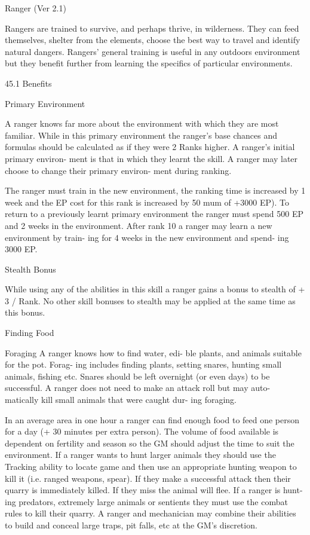 \begin{Chapter}{Ranger (Ver 2.1)}

Rangers are trained to survive, and perhaps thrive, 
in  wilderness.  They  can  feed  themselves,  shelter 
from  the  elements,  choose  the  best  way  to  travel 
and  identify  natural  dangers.  Rangers’  general 
training  is  useful  in any  outdoors  environment but 
they  benefit  further  from  learning  the  specifics  of 
particular environments. 

45.1 Benefits 

Primary Environment 

A  ranger  knows  far  more  about  the  environment 
with  which  they  are  most  familiar.  While  in  this 
primary environment the ranger’s base chances and 
formulas  should  be  calculated  as  if  they  were  2 
Ranks  higher.  A  ranger’s  initial  primary  environ-
ment is that in which they learnt the skill. A ranger 
may  later  choose  to  change  their  primary  environ-
ment during ranking. 

The ranger must train in the new environment, the 
ranking  time  is  increased  by  1  week  and  the  EP 
cost  for  this  rank  is  increased  by  50%
mum  of  +3000  EP).  To  return  to  a  previously 
learnt  primary  environment  the  ranger  must  spend 
500 EP and 2 weeks in the environment. After rank 
10 a ranger may learn a new environment by train-
ing for 4 weeks in the new environment and spend-
ing 3000 EP. 

Stealth Bonus 

While  using  any  of  the  abilities  in  this  skill  a 
ranger  gains  a  bonus  to  stealth  of  +  3  /  Rank.  No 
other skill bonuses to stealth may be applied at the 
same time as this bonus. 

Finding Food 

Foraging  A  ranger  knows  how  to  find  water,  edi-
ble plants, and animals suitable for the pot. Forag-
ing  includes  finding  plants,  setting  snares,  hunting 
small  animals,  fishing  etc.  Snares  should  be  left 
overnight (or even days) to be successful. A ranger 
does not need to make an attack roll but may auto-
matically  kill  small  animals  that  were  caught  dur-
ing foraging. 

In  an  average  area  in  one  hour  a  ranger  can  find 
enough  food  to  feed  one  person  for  a  day  (+  30 
minutes  per  extra  person).  The  volume  of  food 
available is dependent on fertility and season so the 
GM should adjust the time to suit the environment. 
If a ranger wants to hunt larger animals they should 
use  the  Tracking  ability  to  locate  game  and  then 
use  an  appropriate  hunting  weapon  to  kill  it  (i.e. 
ranged  weapons,  spear).  If  they  make  a  successful 
attack  then  their  quarry  is  immediately  killed.  If 
they  miss the  animal  will  flee.  If  a  ranger  is  hunt-
ing predators, extremely large animals or sentients 
they must use the combat rules to kill their quarry. 
A  ranger  and  mechanician  may  combine  their 
abilities  to  build  and  conceal  large  traps,  pit  falls, 
etc at the GM’s discretion. 


\end{Chapter}
